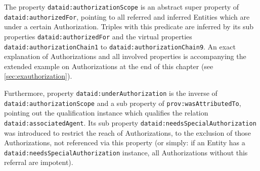 \documentclass[a4paper,english,twoside,BCOR1.5cm,headsepline,DIV12,appendixprefix,final,12pt]{scrbook}
\newcommand{\prop}[1]{{{\texttt{#1}}}}
\begin{document}
The property \prop{dataid:authorizationScope} is an abstract super property of \prop{dataid:authorizedFor}, pointing to all referred and inferred Entities which are under a certain Authorization. Triples with this predicate are inferred by its sub properties \prop{dataid:authorizedFor} and the virtual properties \prop{dataid:authorizationChain1} to \prop{dataid:authorizationChain9}. An exact explanation of Authorizations and all involved properties is accompanying the extended example on Authorizations at the end of this chapter (see \cref{sec:exauthorization}).

Furthermore, property \prop{dataid:underAuthorization} is the inverse of \prop{dataid:authorizationScope} and a sub property of \prop{prov:wasAttributedTo}, pointing out the qualification instance which qualifies the relation \prop{dataid:associatedAgent}. Its sub property \prop{dataid:needsSpecialAuthorization} was introduced to restrict the reach of Authorizations, to the exclusion of those Authorizations, not referenced via this property (or simply: if an Entity has a \prop{dataid:needsSpecialAuthorization} instance, all Authorizations without this referral are impotent).
\end{document}
